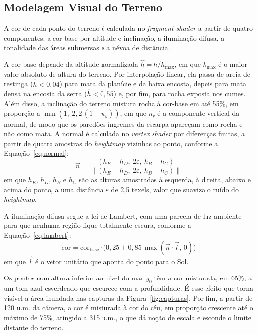 \documentclass[conference]{IEEEtran}
\begin{document}
\subsection{Modelagem Visual do Terreno}
\label{sub:visual}

A cor de cada ponto do terreno é calculada no \emph{fragment shader} a
partir de quatro componentes: a cor-base por altitude e inclinação, a
iluminação difusa, a tonalidade das áreas submersas e a névoa de distância.

A cor-base depende da altitude normalizada $\hat{h} = h / h_{\max}$, em que
$h_{\max}$ é o maior valor absoluto de altura do terreno. Por interpolação linear, ela passa de
areia de restinga ($\hat{h} < 0{,}04$) para mata da planície e da baixa
encosta, depois para mata densa na encosta da serra ($\hat{h} < 0{,}55$) e,
por fim, para rocha exposta nos cumes. Além disso, a inclinação do terreno
mistura rocha à cor-base em até 55\%, em proporção a
$\min(1,\ 2{,}2\,(1 - n_y))$, em que $n_y$ é a componente vertical da normal, de modo que os paredões íngremes da
escarpa apareçam como rocha e não como mata. A normal é calculada no
\emph{vertex shader} por diferenças finitas, a partir de quatro amostras do
\emph{heightmap} vizinhas ao ponto, conforme a Equação~\eqref{eq:normal}:
\begin{equation}
\vec{n} = \frac{(h_E - h_D,\ 2\varepsilon,\ h_B - h_C)}{\left\lVert (h_E - h_D,\ 2\varepsilon,\ h_B - h_C) \right\rVert}
\label{eq:normal}
\end{equation}
em que $h_E$, $h_D$, $h_B$ e $h_C$ são as alturas amostradas à esquerda, à
direita, abaixo e acima do ponto, a uma distância $\varepsilon$ de 2,5 texels,
valor que suaviza o ruído do \emph{heightmap}.

A iluminação difusa segue a lei de Lambert, com uma parcela de luz ambiente
para que nenhuma região fique totalmente escura, conforme a
Equação~\eqref{eq:lambert}:
\begin{equation}
\text{cor} = \text{cor}_{\text{base}} \cdot \big(0{,}25 + 0{,}85\,\max(\vec{n} \cdot \vec{l},\, 0)\big)
\label{eq:lambert}
\end{equation}
em que $\vec{l}$ é o vetor unitário que aponta do ponto para o Sol.

Os pontos com altura inferior ao nível do mar $y_0$ têm a cor misturada, em
65\%, a um tom azul-esverdeado que escurece com a profundidade. É esse
efeito que torna visível a área inundada nas capturas da
Figura~\ref{fig:capturas}. Por fim, a partir de 120 u.m. da câmera, a cor é
misturada à cor do céu, em proporção crescente até o máximo de 75\%,
atingido a 315 u.m., o que
dá noção de escala e esconde o limite distante do terreno.
\end{document}
